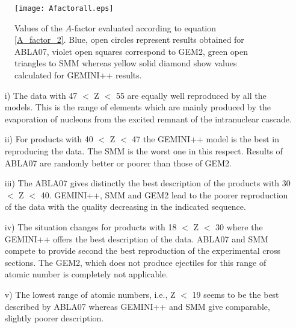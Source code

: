 \begin{figure}
    \centering
    \texttt{[image: Afactorall.eps]}
    \caption{Values of the $A$-factor evaluated according to equation \ref{A_factor_2}. 
    Blue, open circles represent results obtained for ABLA07, violet open squares correspond to GEM2, green open triangles to SMM whereas yellow solid diamond show values calculated for GEMINI++ results.}
    \label{Afactorall}
\end{figure}
\begin{itemize}
    \item[i)]  The data with 47 $<$ Z $<$ 55 are equally well reproduced
by all the models. This is the range of elements
which are mainly produced by the evaporation of nucleons
from the excited remnant of the intranuclear
cascade.
\item[ii)] For products with 40 $<$ Z $<$ 47 the GEMINI++ model is the best
in reproducing the data. The SMM is the worst 
one in this respect. Results of ABLA07 are randomly better or poorer than those of GEM2.
\item[iii)] The ABLA07 gives distinctly the best description of
the products with 30 $<$ Z $<$ 40. GEMINI++, SMM
and GEM2 lead to the poorer reproduction of the data
with the quality decreasing in the indicated sequence.
\item[iv)] The situation changes for products with 18 $<$ Z $<$ 30
where the GEMINI++ offers the best description of
the data. ABLA07 and SMM compete to provide second
the best reproduction of the experimental cross
sections. The GEM2, which does not produce ejectiles
for this range of atomic number is completely not applicable.
\item[v)] The lowest range of atomic numbers, i.e., Z $<$ 19
seems to be the best described by ABLA07 whereas
GEMINI++ and SMM give comparable, slightly
poorer description.
\end{itemize}
